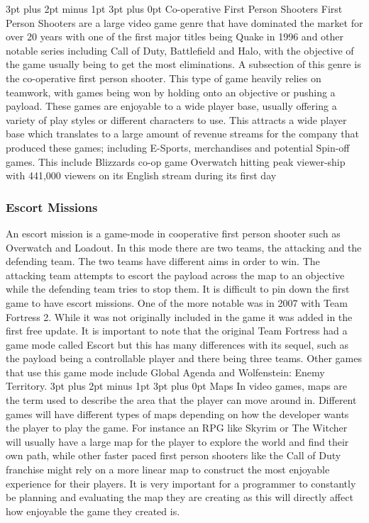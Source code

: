 \documentclass[12pt,a4paper,oneside]{book}
\makeatletter
\renewcommand\subsection{\@startsection {subsection}{1}{2mm} %
                               {3pt plus 2pt minus 1pt} %
                               {3pt plus 0pt} %
                               {\normalfont\bfseries}}
\makeatother
\begin{document}
\subsection{Co-operative First Person Shooters}
First Person Shooters are a large video game genre that have dominated the market for over 20 years with one of the first major titles being Quake in 1996 and other notable series including Call of Duty, Battlefield and Halo, with the objective of the game usually being to get the most eliminations. 
\vspace{5mm} 
\newline
A subsection of this genre is the co-operative first person shooter. This type of game heavily relies on teamwork, with games being won by holding onto an objective or pushing a payload. These games are enjoyable to a wide player base, usually offering a variety of play styles or different characters to use. This attracts a wide player base which translates to a large amount of revenue streams for the company that produced these games; including E-Sports, merchandises and potential Spin-off games. This include Blizzards co-op game Overwatch hitting peak viewer-ship with 441,000 viewers on its English stream during its first day \cite{LukeChristou}
\subsubsection{Escort Missions}
An escort mission is a game-mode in cooperative first person shooter such as Overwatch and Loadout. In this mode there are two teams, the attacking and the defending team. The two teams have different aims in order to win. The attacking team attempts to escort the payload across the map to an objective while the defending team tries to stop them. It is difficult to pin down the first game to have escort missions. One of the more notable was in 2007 with Team Fortress 2. While it was not originally included in the game it was added in the first free update. It is important to note that the original Team Fortress had a game mode called Escort but this has many differences with its sequel, such as the payload being a controllable player and there being three teams. Other games that use this game mode include Global Agenda and Wolfenstein: Enemy Territory.    
\subsection{Maps}
In video games, maps are the term used to describe the area that the player can move around in. Different games will have different types of maps depending on how the developer wants the player to play the game. For instance an RPG like Skyrim or The Witcher will usually have a large map for the player to explore the world and find their own path, while other faster paced first person shooters like the Call of Duty franchise might rely on a more linear map to construct the most enjoyable experience for their players. It is very important for a programmer to constantly be planning and evaluating the map they are creating as this will directly affect how enjoyable the game they created is.
\end{document}
